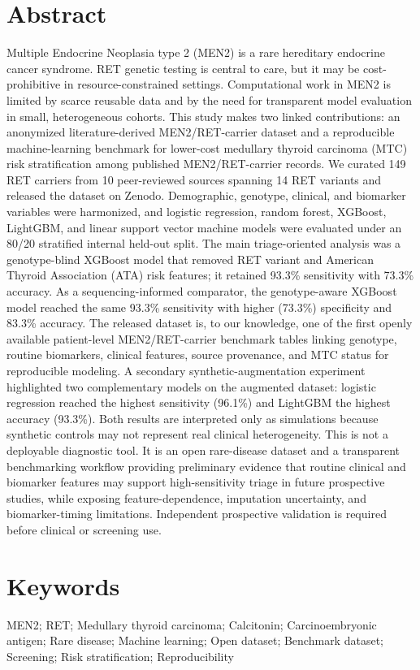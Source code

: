 \documentclass[12pt]{article}
\begin{document}
\section*{Abstract}
Multiple Endocrine Neoplasia type 2 (MEN2) is a rare hereditary endocrine cancer syndrome. RET genetic testing is central to care, but it may be cost-prohibitive in resource-constrained settings. Computational work in MEN2 is limited by scarce reusable data and by the need for transparent model evaluation in small, heterogeneous cohorts. This study makes two linked contributions: an anonymized literature-derived MEN2/RET-carrier dataset and a reproducible machine-learning benchmark for lower-cost medullary thyroid carcinoma (MTC) risk stratification among published MEN2/RET-carrier records. We curated 149 RET carriers from 10 peer-reviewed sources spanning 14 RET variants and released the dataset on Zenodo. Demographic, genotype, clinical, and biomarker variables were harmonized, and logistic regression, random forest, XGBoost, LightGBM, and linear support vector machine models were evaluated under an 80/20 stratified internal held-out split. The main triage-oriented analysis was a genotype-blind XGBoost model that removed RET variant and American Thyroid Association (ATA) risk features; it retained 93.3\% sensitivity with 73.3\% accuracy. As a sequencing-informed comparator, the genotype-aware XGBoost model reached the same 93.3\% sensitivity with higher (73.3\%) specificity and 83.3\% accuracy. The released dataset is, to our knowledge, one of the first openly available patient-level MEN2/RET-carrier benchmark tables linking genotype, routine biomarkers, clinical features, source provenance, and MTC status for reproducible modeling. A secondary synthetic-augmentation experiment highlighted two complementary models on the augmented dataset: logistic regression reached the highest sensitivity (96.1\%) and LightGBM the highest accuracy (93.3\%). Both results are interpreted only as simulations because synthetic controls may not represent real clinical heterogeneity. This is not a deployable diagnostic tool. It is an open rare-disease dataset and a transparent benchmarking workflow providing preliminary evidence that routine clinical and biomarker features may support high-sensitivity triage in future prospective studies, while exposing feature-dependence, imputation uncertainty, and biomarker-timing limitations. Independent prospective validation is required before clinical or screening use.

\section*{Keywords}
MEN2; RET; Medullary thyroid carcinoma; Calcitonin; Carcinoembryonic antigen; Rare disease; Machine learning; Open dataset; Benchmark dataset; Screening; Risk stratification; Reproducibility
\end{document}

